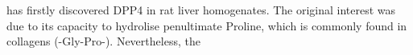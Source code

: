 \citet{Hopsu-Havu1966} has firstly discovered DPP4 in rat liver homogenates. The original interest was due to its capacity to hydrolise penultimate Proline, which is commonly found in collagens (-Gly-Pro-). Nevertheless, the 